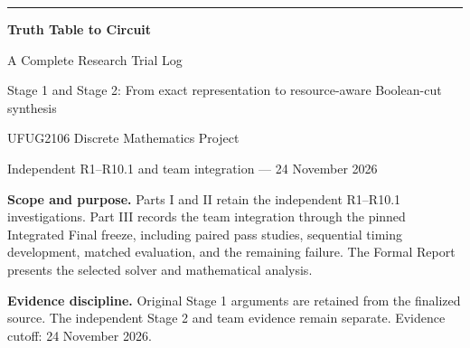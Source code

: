 \begin{titlepage}
\thispagestyle{empty}
\vspace*{1.6cm}
{\noindent\sffamily\color{ResearchBlue}\rule{\textwidth}{4pt}}\par
\vspace{1.15cm}
{\Huge\bfseries Truth Table to Circuit}\par\vspace{.3cm}
{\LARGE A Complete Research Trial Log\par}
\vspace{.5cm}
{\large Stage 1 and Stage 2: From exact representation to resource-aware Boolean-cut synthesis\par}
\vspace{.85cm}
{\large UFUG2106 Discrete Mathematics Project\par}
\vspace{.45cm}
{\large Independent R1--R10.1 and team integration --- 24 November 2026\par}
\vfill
\begin{tcolorbox}[colback=ResearchIvory,colframe=ResearchSlate,arc=2mm]
\textbf{Scope and purpose.} Parts I and II retain the independent R1--R10.1 investigations. Part III records the team integration through the pinned Integrated Final freeze, including paired pass studies, sequential timing development, matched evaluation, and the remaining failure. The Formal Report presents the selected solver and mathematical analysis.
\end{tcolorbox}
\vfill
\textbf{Evidence discipline.} Original Stage 1 arguments are retained from the finalized source. The independent Stage 2 and team evidence remain separate. Evidence cutoff: 24 November 2026.\par
\end{titlepage}

